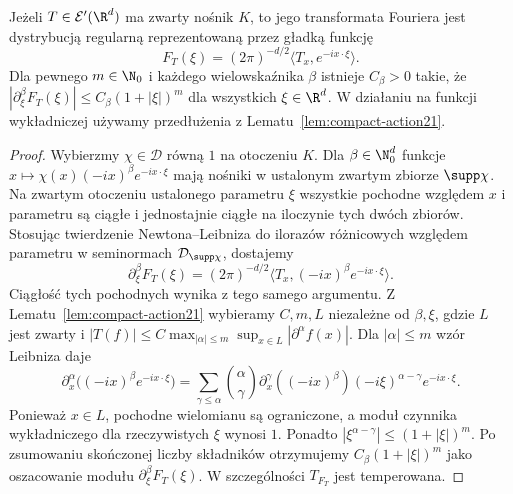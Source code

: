 \begin{twierdzenie}
\label{thm:compact-fourier22}
Jeżeli $T\in\mathcal E'(\R^d)$ ma zwarty nośnik $K$,
to jego transformata Fouriera jest dystrybucją regularną
reprezentowaną przez gładką funkcję
\[
F_T(\xi)=(2\pi)^{-d/2}\langle T_x,e^{-ix\cdot\xi}\rangle.
\]
Dla pewnego $m\in\N_0$ i każdego wielowskaźnika $\beta$
istnieje $C_\beta>0$ takie, że
$|\partial_\xi^\beta F_T(\xi)|
\le C_\beta(1+|\xi|)^m$
dla wszystkich $\xi\in\R^d$.
W działaniu na funkcji wykładniczej używamy
przedłużenia z Lematu~\ref{lem:compact-action21}.
\end{twierdzenie}
\begin{proof}
Wybierzmy $\chi\in\mathcal D$ równą $1$ na
otoczeniu $K$. Dla $\beta\in\N_0^d$ funkcje
$x\mapsto\chi(x)(-ix)^\beta e^{-ix\cdot\xi}$
mają nośniki w ustalonym zwartym zbiorze $\supp\chi$.
Na zwartym otoczeniu ustalonego parametru $\xi$
wszystkie pochodne względem $x$ i parametru są ciągłe
i jednostajnie ciągłe na iloczynie tych dwóch zbiorów.
Stosując twierdzenie Newtona--Leibniza do ilorazów
różnicowych względem parametru w seminormach
$\mathcal D_{\supp\chi}$, dostajemy
\[
 \partial_\xi^\beta F_T(\xi)
 =(2\pi)^{-d/2}
 \langle T_x,(-ix)^\beta e^{-ix\cdot\xi}\rangle.
\]
Ciągłość tych pochodnych wynika z tego samego argumentu.
Z Lematu~\ref{lem:compact-action21} wybieramy $C,m,L$
niezależne od $\beta,\xi$, gdzie $L$ jest zwarty i
$|T(f)|\le C\max_{|\alpha|\le m}\sup_{x\in L}
|\partial^\alpha f(x)|$.
Dla $|\alpha|\le m$ wzór Leibniza daje
\[
 \partial_x^\alpha\bigl((-ix)^\beta e^{-ix\cdot\xi}\bigr)
 =\sum_{\gamma\le\alpha}\binom\alpha\gamma
 \partial_x^\gamma((-ix)^\beta)
 (-i\xi)^{\alpha-\gamma}e^{-ix\cdot\xi}.
\]
Ponieważ $x\in L$, pochodne wielomianu są ograniczone,
a moduł czynnika wykładniczego dla rzeczywistych $\xi$
wynosi $1$. Ponadto $|\xi^{\alpha-\gamma}|
\le(1+|\xi|)^m$. Po zsumowaniu skończonej liczby
składników otrzymujemy $C_\beta(1+|\xi|)^m$ jako
oszacowanie modułu $\partial_\xi^\beta F_T(\xi)$.
W szczególności $T_{F_T}$ jest temperowana.


\end{proof}
